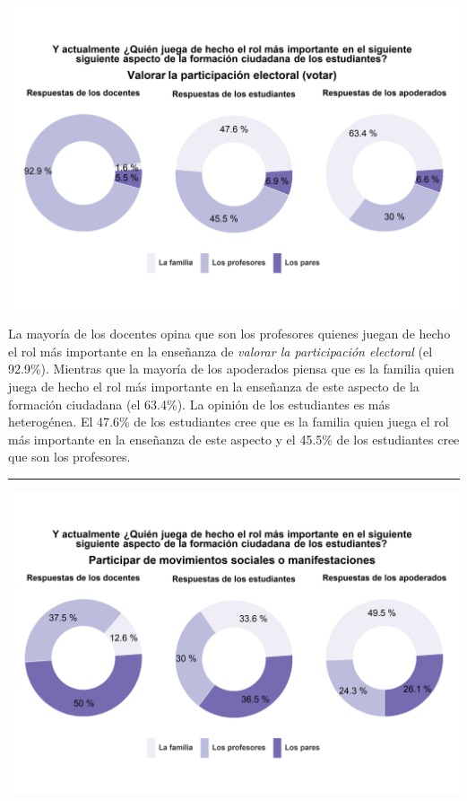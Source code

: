 \documentclass[
  14pt,
]{book}
\let\origfigure\figure
\let\endorigfigure\endfigure
\renewenvironment{figure}[1][2] {
  \expandafter\origfigure\expandafter[H]
} {
  \endorigfigure
}
\begin{document}
\begin{figure}[!ht]

{\centering \includegraphics[width=0.8\linewidth,]{images/graph_for_ciud9} 

}

\caption{Quién juega el rol más importante en valorar la participación electoral}\label{fig:unnamed-chunk-33}
\end{figure}

La mayoría de los docentes opina que son los profesores quienes juegan de hecho el rol más importante en la enseñanza de \emph{valorar la participación electoral} (el 92.9\%). Mientras que la mayoría de los apoderados piensa que es la familia quien juega de hecho el rol más importante en la enseñanza de este aspecto de la formación ciudadana (el 63.4\%). La opinión de los estudiantes es más heterogénea. El 47.6\% de los estudiantes cree que es la familia quien juega el rol más importante en la enseñanza de este aspecto y el 45.5\% de los estudiantes cree que son los profesores.

\begin{center}\rule{0.5\linewidth}{0.5pt}\end{center}

\begin{figure}[!ht]

{\centering \includegraphics[width=0.8\linewidth,]{images/graph_for_ciud10} 

}

\caption{Quién juega el rol más importante en participar en movimientos sociales}\label{fig:unnamed-chunk-34}
\end{figure}
\end{document}
